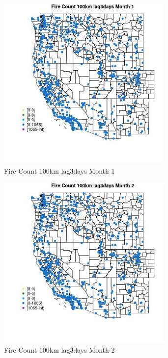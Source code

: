 \begin{figure} 
\centering  
\includegraphics[width=0.77\textwidth]{Code_Outputs/Report_ML_input_PM25_Step4_part_f_de_duplicated_aveswNAs_MapObsMo1Fire_Count_100km_lag3days.jpg} 
\caption{\label{fig:Report_ML_input_PM25_Step4_part_f_de_duplicated_aveswNAsMapObsMo1Fire_Count_100km_lag3days}Fire Count 100km lag3days Month 1} 
\end{figure} 
 

\begin{figure} 
\centering  
\includegraphics[width=0.77\textwidth]{Code_Outputs/Report_ML_input_PM25_Step4_part_f_de_duplicated_aveswNAs_MapObsMo2Fire_Count_100km_lag3days.jpg} 
\caption{\label{fig:Report_ML_input_PM25_Step4_part_f_de_duplicated_aveswNAsMapObsMo2Fire_Count_100km_lag3days}Fire Count 100km lag3days Month 2} 
\end{figure} 
 

